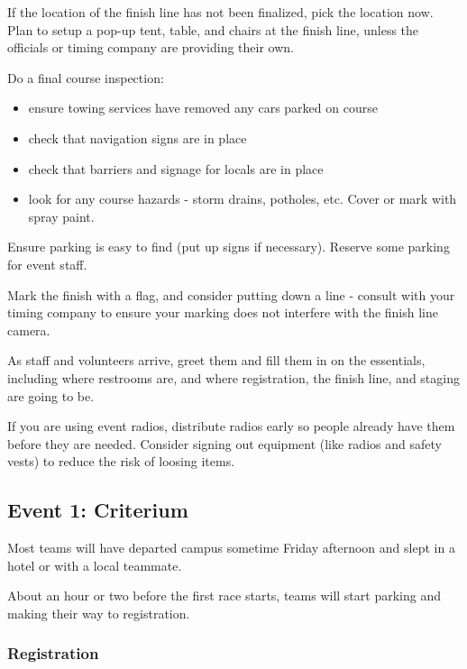 \documentclass[
  letterpaper, %
  fontsize=10pt, %
  twoside=true,
  chapterentrydots=true, %
  numbers=noenddot,
  fontmethod=tex,
]{kaobook}
\begin{document}
If the location of the finish line has not been finalized, pick the location now.
Plan to setup a pop-up tent, table, and chairs at the finish line, unless the officials or timing company are providing their own.

Do a final course inspection:
\begin{itemize}
  \item ensure towing services have removed any cars parked on course
  \item check that navigation signs are in place
  \item check that barriers and signage for locals are in place
  \item look for any course hazards - storm drains, potholes, etc. Cover or mark with spray paint.
\end{itemize}

Ensure parking is easy to find (put up signs if necessary).
Reserve some parking for event staff.

Mark the finish with a flag, and consider putting down a line - consult with your timing company to ensure your marking does not interfere with the finish line camera.

As staff and volunteers arrive, greet them and fill them in on the essentials, including where restrooms are,
and where registration, the finish line, and staging are going to be.

If you are using event radios, %
distribute radios early so people already have them before they are needed.
Consider signing out equipment (like radios and safety vests) to reduce the risk of loosing items.

\subsection{Event 1: Criterium}

Most teams will have departed campus sometime Friday afternoon and slept in a hotel or with a local teammate.

About an hour or two before the first race starts,
teams will start parking and making their way to registration.

\subsubsection{Registration}
\end{document}

